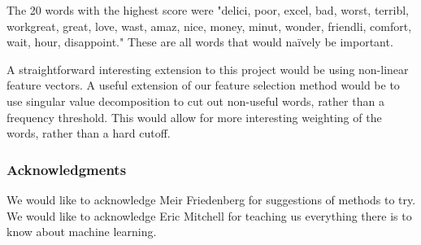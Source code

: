 \documentclass{article} %
\begin{document}
	The 20 words with the highest score were "delici, poor, excel, bad, worst, terribl, workgreat, great, love, wast, amaz, nice, money, minut, wonder, friendli, comfort, wait, hour, disappoint." These are all words that would na\"ively be important.
	
	A straightforward interesting extension to this project would be using non-linear feature vectors. A useful extension of our feature selection method would be to use singular value decomposition to cut out non-useful words, rather than a frequency threshold. This would allow for more interesting weighting of the words, rather than a hard cutoff.
	
	\subsubsection*{Acknowledgments}
	
	We would like to acknowledge Meir Friedenberg for suggestions of methods to try. We would like to acknowledge Eric Mitchell for teaching us everything there is to know about machine learning. 
	
	
	
	
	
\end{document}
